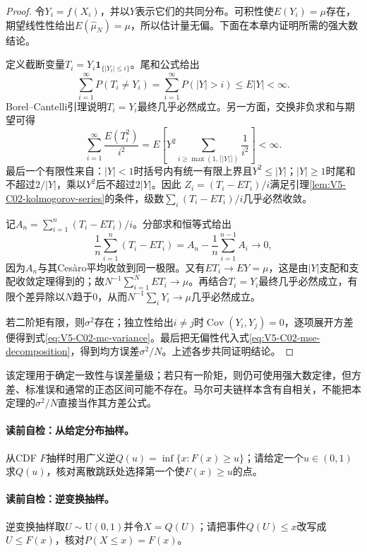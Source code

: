 \begin{proof}
令$Y_i=f(X_i)$，并以$Y$表示它们的共同分布。可积性使$E(Y_i)=\mu$存在，期望线性性给出$E(\widehat\mu_N)=\mu$，所以估计量无偏。下面在本章内证明所需的强大数结论。

定义截断变量$T_i=Y_i\boldsymbol1_{\{|Y_i|\le i\}}$。尾和公式给出
\[
\sum_{i=1}^{\infty}P(T_i\ne Y_i)
=\sum_{i=1}^{\infty}P(|Y|>i)\le E|Y|<\infty.
\]
Borel--Cantelli引理说明$T_i=Y_i$最终几乎必然成立。另一方面，交换非负求和与期望可得
\[
\sum_{i=1}^{\infty}\frac{E(T_i^2)}{i^2}
=E\!\left[Y^2\sum_{i\ge\max(1,\lceil|Y|\rceil)}\frac1{i^2}\right]<\infty.
\]
最后一个有限性来自：$|Y|<1$时括号内有统一有限上界且$Y^2\le|Y|$；$|Y|\ge1$时尾和不超过$2/|Y|$，乘以$Y^2$后不超过$2|Y|$。因此
$Z_i=(T_i-E T_i)/i$满足引理\ref{lem:V5-C02-kolmogorov-series}的条件，级数$\sum_i(T_i-E T_i)/i$几乎必然收敛。

记$A_n=\sum_{i=1}^n(T_i-E T_i)/i$。分部求和恒等式给出
\[
\frac1n\sum_{i=1}^n(T_i-E T_i)
=A_n-\frac1n\sum_{i=1}^{n-1}A_i\longrightarrow0,
\]
因为$A_n$与其Ces\`aro平均收敛到同一极限。又有$E T_i\to EY=\mu$，这是由$|Y|$支配和支配收敛定理得到的；故$N^{-1}\sum_{i=1}^NE T_i\to\mu$。再结合$T_i=Y_i$最终几乎必然成立，有限个差异除以$N$趋于$0$，从而$N^{-1}\sum_iY_i\to\mu$几乎必然成立。

若二阶矩有限，则$\sigma^2$存在；独立性给出$i\ne j$时$\operatorname{Cov}(Y_i,Y_j)=0$，逐项展开方差便得到式\eqref{eq:V5-C02-mc-variance}。最后把无偏性代入式\eqref{eq:V5-C02-mse-decomposition}，得到均方误差$\sigma^2/N$。上述各步共同证明结论。
\end{proof}
该定理用于确定一致性与误差量级；若只有一阶矩，则仍可使用强大数定律，但方差、标准误和通常的正态区间可能不存在。马尔可夫链样本含有自相关，不能把本定理的$\sigma^2/N$直接当作其方差公式。

\paragraph{读前自检：从给定分布抽样。}从CDF $F$抽样时用广义逆$Q(u)=\inf\{x:F(x)\ge u\}$；请给定一个$u\in(0,1)$求$Q(u)$，核对离散跳跃处选择第一个使$F(x)\ge u$的点。\par
\paragraph{读前自检：逆变换抽样。}逆变换抽样取$U\sim\mathrm U(0,1)$并令$X=Q(U)$；请把事件$Q(U)\le x$改写成$U\le F(x)$，核对$P(X\le x)=F(x)$。\par

